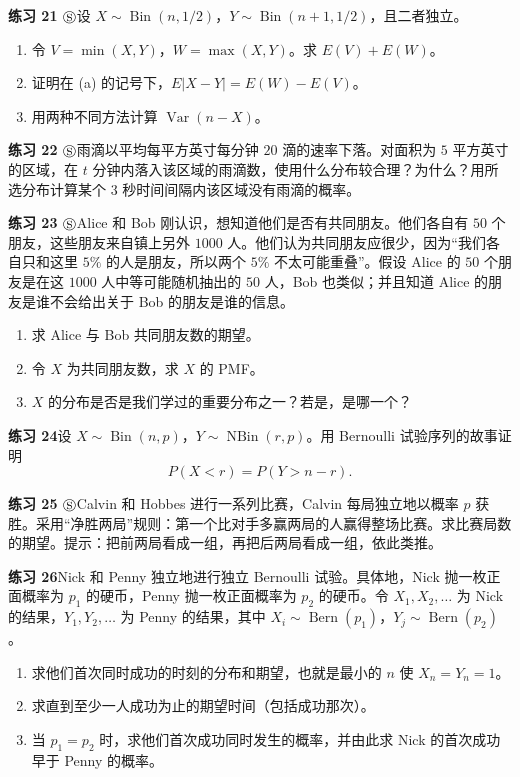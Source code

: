 \documentclass[UTF8, 12pt, fontset=fandol, oneside]{ctexart}
\begin{document}
\noindent\textbf{练习 21 $\circledS$}\quad 设 $X\sim\operatorname{Bin}(n,1/2)$，$Y\sim\operatorname{Bin}(n+1,1/2)$，且二者独立。
\begin{enumerate}
  \item[(a)] 令 $V=\min(X,Y)$，$W=\max(X,Y)$。求 $E(V)+E(W)$。
  \item[(b)] 证明在 (a) 的记号下，$E|X-Y|=E(W)-E(V)$。
  \item[(c)] 用两种不同方法计算 $\operatorname{Var}(n-X)$。
\end{enumerate}

\noindent\textbf{练习 22 $\circledS$}\quad 雨滴以平均每平方英寸每分钟 $20$ 滴的速率下落。对面积为 $5$ 平方英寸的区域，在 $t$ 分钟内落入该区域的雨滴数，使用什么分布较合理？为什么？用所选分布计算某个 $3$ 秒时间间隔内该区域没有雨滴的概率。

\noindent\textbf{练习 23 $\circledS$}\quad Alice 和 Bob 刚认识，想知道他们是否有共同朋友。他们各自有 $50$ 个朋友，这些朋友来自镇上另外 $1000$ 人。他们认为共同朋友应很少，因为“我们各自只和这里 $5\%$ 的人是朋友，所以两个 $5\%$ 不太可能重叠”。假设 Alice 的 $50$ 个朋友是在这 $1000$ 人中等可能随机抽出的 $50$ 人，Bob 也类似；并且知道 Alice 的朋友是谁不会给出关于 Bob 的朋友是谁的信息。
\begin{enumerate}
  \item[(a)] 求 Alice 与 Bob 共同朋友数的期望。
  \item[(b)] 令 $X$ 为共同朋友数，求 $X$ 的 PMF。
  \item[(c)] $X$ 的分布是否是我们学过的重要分布之一？若是，是哪一个？
\end{enumerate}

\noindent\textbf{练习 24}\quad 设 $X\sim\operatorname{Bin}(n,p)$，$Y\sim\operatorname{NBin}(r,p)$。用 Bernoulli 试验序列的故事证明
\[
  P(X<r)=P(Y>n-r).
\]

\noindent\textbf{练习 25 $\circledS$}\quad Calvin 和 Hobbes 进行一系列比赛，Calvin 每局独立地以概率 $p$ 获胜。采用“净胜两局”规则：第一个比对手多赢两局的人赢得整场比赛。求比赛局数的期望。提示：把前两局看成一组，再把后两局看成一组，依此类推。

\noindent\textbf{练习 26}\quad Nick 和 Penny 独立地进行独立 Bernoulli 试验。具体地，Nick 抛一枚正面概率为 $p_1$ 的硬币，Penny 抛一枚正面概率为 $p_2$ 的硬币。令 $X_1,X_2,\ldots$ 为 Nick 的结果，$Y_1,Y_2,\ldots$ 为 Penny 的结果，其中 $X_i\sim\operatorname{Bern}(p_1)$，$Y_j\sim\operatorname{Bern}(p_2)$。
\begin{enumerate}
  \item[(a)] 求他们首次同时成功的时刻的分布和期望，也就是最小的 $n$ 使 $X_n=Y_n=1$。
  \item[(b)] 求直到至少一人成功为止的期望时间（包括成功那次）。
  \item[(c)] 当 $p_1=p_2$ 时，求他们首次成功同时发生的概率，并由此求 Nick 的首次成功早于 Penny 的概率。
\end{enumerate}
\end{document}
